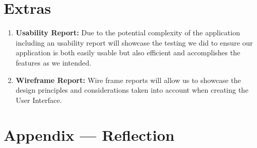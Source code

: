 \documentclass{article}
\begin{document}
\section{Extras}

\begin{enumerate}
    \item \textbf{Usability Report:} Due to the potential complexity of the application including an usability report will showcase the testing we did to ensure our application is both easily usable but also efficient and accomplishes the features as we intended.
    \item \textbf{Wireframe Report:} Wire frame reports will allow us to showcase the design principles and considerations taken into account when creating the User Interface.
\end{enumerate}

\newpage{}

\section*{Appendix --- Reflection}
\end{document}
